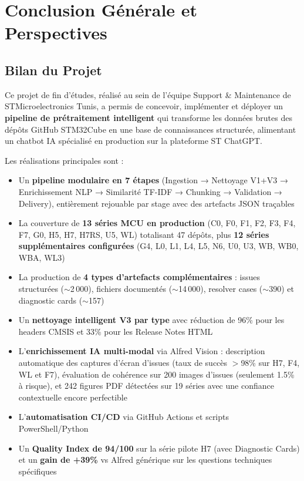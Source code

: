 \documentclass[12pt,a4paper]{report}
\begin{document}
\fi

\chapter*{Conclusion Générale et Perspectives}
\label{chap:conclusion}

\section{Bilan du Projet}

Ce projet de fin d'études, réalisé au sein de l'équipe Support \& Maintenance de STMicroelectronics Tunis, a permis de concevoir, implémenter et déployer un \textbf{pipeline de prétraitement intelligent} qui transforme les données brutes des dépôts GitHub STM32Cube en une base de connaissances structurée, alimentant un chatbot IA spécialisé en production sur la plateforme ST ChatGPT.

Les réalisations principales sont :
\begin{itemize}
  \item Un \textbf{pipeline modulaire en 7 étapes} (Ingestion → Nettoyage V1+V3 → Enrichissement NLP → Similarité TF-IDF → Chunking → Validation → Delivery), entièrement rejouable par stage avec des artefacts JSON traçables
  \item La couverture de \textbf{13 séries MCU en production} (C0, F0, F1, F2, F3, F4, F7, G0, H5, H7, H7RS, U5, WL) totalisant 47 dépôts, plus \textbf{12 séries supplémentaires configurées} (G4, L0, L1, L4, L5, N6, U0, U3, WB, WB0, WBA, WL3)
  \item La production de \textbf{4 types d'artefacts complémentaires} : issues structurées ($\sim$2\,000), fichiers documentés ($\sim$14\,000), resolver cases ($\sim$390) et diagnostic cards ($\sim$157)
  \item Un \textbf{nettoyage intelligent V3 par type} avec réduction de 96\% pour les headers CMSIS et 33\% pour les Release Notes HTML
  \item L'\textbf{enrichissement IA multi-modal} via Alfred Vision : description automatique des captures d'écran d'issues (taux de succès $>$98\% sur H7, F4, WL et F7), évaluation de cohérence sur 200 images d'issues (seulement 1.5\% à risque), et 242 figures PDF détectées sur 19 séries avec une confiance contextuelle encore perfectible
  \item L'\textbf{automatisation CI/CD} via GitHub Actions et scripts PowerShell/Python
  \item Un \textbf{Quality Index de 94/100} sur la série pilote H7 (avec Diagnostic Cards) et un \textbf{gain de +39\%} vs Alfred générique sur les questions techniques spécifiques
\end{itemize}
\end{document}
